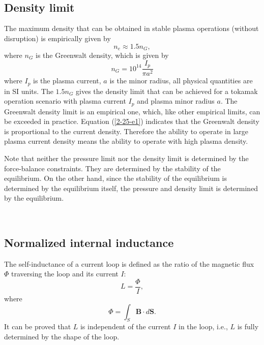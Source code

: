 \documentclass{llncs}
\begin{document}
\

\

\subsection{Density limit}

The maximum density that can be obtained in stable plasma operations (without
disruption) is empirically given by
\begin{equation}
  n_e \approx 1.5 n_G,
\end{equation}
where $n_G$ is the Greenwalt density, which is given by
\begin{equation}
  \label{2-25-e1} n_G = 10^{14} \frac{I_p}{\pi a^2}
\end{equation}
where $I_p$ is the plasma current, $a$ is the minor radius, all physical
quantities are in SI units. The $1.5 n_G$ gives the density limit that can be
achieved for a tokamak operation scenario with plasma current $I_p$ and plasma
minor radius $a$. The Greenwalt density limit is an empirical one, which, like
other empirical limits, can be exceeded in practice. Equation (\ref{2-25-e1})
indicates that the Greenwalt density is proportional to the current density.
Therefore the ability to operate in large plasma current density means the
ability to operate with high plasma density.

Note that neither the pressure limit nor the density limit is determined by
the force-balance constraints. They are determined by the stability of the
equilibrium. On the other hand, since the stability of the equilibrium is
determined by the equilibrium itself, the pressure and density limit is
determined by the equilibrium.

\

\subsection{Normalized internal inductance}

The self-inductance of a current loop is defined as the ratio of the magnetic
flux $\Phi$ traversing the loop and its current $I$:
\begin{equation}
  L = \frac{\Phi}{I},
\end{equation}
where
\begin{equation}
  \Phi = \int_S \mathbf{B} \cdot d\mathbf{S}.
\end{equation}
It can be proved that $L$ is independent of the current $I$ in the loop, i.e.,
$L$ is fully determined by the shape of the loop.
\end{document}

